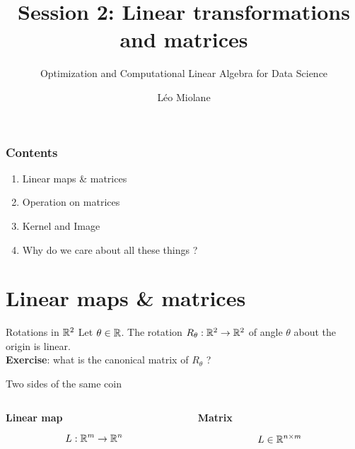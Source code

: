 \documentclass{beamer}
\title{Session 2: Linear transformations and matrices}
\subtitle{Optimization and Computational Linear Algebra for Data Science}
\author{Léo Miolane}
\date{}
\begin{document}
\setcounter{showProgressBar}{0}
\setcounter{showSlideNumbers}{0}

\frame{\titlepage}

\begin{frame}
	\frametitle{Contents}
	\begin{enumerate}
		\item Linear maps \& matrices
		\item Operation on matrices
		\item Kernel and Image
		\item Why do we care about all these things ? 
	\end{enumerate}
\end{frame}


\setcounter{framenumber}{0}
\setcounter{showSlideNumbers}{1}

\section{Linear maps \& matrices}

\begin{frame}[t]{Rotations in $\mathbb{R}^2$}
	Let $\theta \in \mathbb{R}$.
	The rotation $R_{\theta}: \mathbb{R}^2 \to \mathbb{R}^2$ of angle $\theta$ about the origin is linear.
			\\
			\vspace{0.3cm}
			\textbf{Exercise}: what is the canonical matrix of $R_{\theta}$ ?
\end{frame}

\begin{frame}[t]{Two sides of the same coin}
	\begin{columns}
		\hspace{-0.85cm}
		\begin{column}{0.5\textwidth}
			\vspace{-0.5cm}
			\begin{center}
				\bf Linear map
			\end{center}
			$$
			L: \mathbb{R}^m \to \mathbb{R}^n
			$$
			\vspace{6cm}
		\end{column}
		\vrule
		\begin{column}{0.5\textwidth}
			\vspace{-0.5cm}
			\begin{center}
			\bf Matrix
			\end{center}
			$$
			L \in \mathbb{R}^{n \times m}
			$$
			\vspace{6cm}
		\end{column}
	\end{columns}
	\pause
\end{frame}
\end{document}
